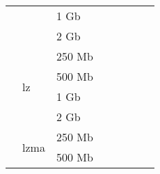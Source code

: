\documentclass{article}           %
\begin{document}
\begin{table}[]
\begin{tabular}{llllllll}
\multicolumn{1}{|l|}{}                               & \multicolumn{1}{l|}{}                         & \multicolumn{1}{l|}{1 Gb}   & \multicolumn{1}{l|}{}       & \multicolumn{1}{l|}{}       & \multicolumn{1}{l|}{}           & \multicolumn{1}{l|}{}      & \multicolumn{1}{l|}{}        \\ \cline{3-8} 
\multicolumn{1}{|l|}{}                               & \multicolumn{1}{l|}{}                         & \multicolumn{1}{l|}{2 Gb}   & \multicolumn{1}{l|}{}       & \multicolumn{1}{l|}{}       & \multicolumn{1}{l|}{}           & \multicolumn{1}{l|}{}      & \multicolumn{1}{l|}{}        \\ \cline{2-8} 
\multicolumn{1}{|l|}{}                               & \multicolumn{1}{l|}{\multirow{4}{*}{lz}}      & \multicolumn{1}{l|}{250 Mb} & \multicolumn{1}{l|}{}       & \multicolumn{1}{l|}{}       & \multicolumn{1}{l|}{}           & \multicolumn{1}{l|}{}      & \multicolumn{1}{l|}{}        \\ \cline{3-8} 
\multicolumn{1}{|l|}{}                               & \multicolumn{1}{l|}{}                         & \multicolumn{1}{l|}{500 Mb} & \multicolumn{1}{l|}{}       & \multicolumn{1}{l|}{}       & \multicolumn{1}{l|}{}           & \multicolumn{1}{l|}{}      & \multicolumn{1}{l|}{}        \\ \cline{3-8} 
\multicolumn{1}{|l|}{}                               & \multicolumn{1}{l|}{}                         & \multicolumn{1}{l|}{1 Gb}   & \multicolumn{1}{l|}{}       & \multicolumn{1}{l|}{}       & \multicolumn{1}{l|}{}           & \multicolumn{1}{l|}{}      & \multicolumn{1}{l|}{}        \\ \cline{3-8} 
\multicolumn{1}{|l|}{}                               & \multicolumn{1}{l|}{}                         & \multicolumn{1}{l|}{2 Gb}   & \multicolumn{1}{l|}{}       & \multicolumn{1}{l|}{}       & \multicolumn{1}{l|}{}           & \multicolumn{1}{l|}{}      & \multicolumn{1}{l|}{}        \\ \cline{2-8} 
\multicolumn{1}{|l|}{}                               & \multicolumn{1}{l|}{\multirow{4}{*}{lzma}}    & \multicolumn{1}{l|}{250 Mb} & \multicolumn{1}{l|}{}       & \multicolumn{1}{l|}{}       & \multicolumn{1}{l|}{}           & \multicolumn{1}{l|}{}      & \multicolumn{1}{l|}{}        \\ \cline{3-8} 
\multicolumn{1}{|l|}{}                               & \multicolumn{1}{l|}{}                         & \multicolumn{1}{l|}{500 Mb} & \multicolumn{1}{l|}{}       & \multicolumn{1}{l|}{}       & \multicolumn{1}{l|}{}           & \multicolumn{1}{l|}{}      & \multicolumn{1}{l|}{}        \\ \cline{3-8} 

\end{tabular}
\end{table}
\end{document}

